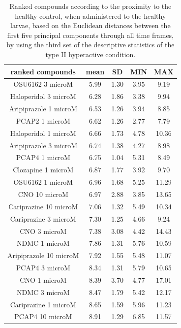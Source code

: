 \documentclass[a4paper,12pt]{article}
\begin{document}
\begin{table}[h!]\tiny
\centering
\caption{Ranked compounds according to the proximity to the healthy control, when administered to the healthy larvae, based on the Euclidean distances between the first five principal components through all time frames, by using the third set of the descriptive statistics of the type II hyperactive condition.}
\begin{tabular}{|c|c|c|c|c|}
\hline
ranked compounds             & mean & SD   & MIN  & MAX   \\ \hline
OSU6162 3 microM       & 5.99  & 1.30  & 3.95 & 9.19  \\ \hline
Haloperidol 3 microM   & 6.28  & 1.86 & 3.38 & 9.94  \\ \hline
Aripiprazole 1 microM  & 6.53  & 1.26 & 3.94 & 8.85  \\ \hline
PCAP2 1 microM         & 6.62  & 1.26 & 2.77 & 7.79  \\ \hline
Haloperidol 1 microM   & 6.66  & 1.73 & 4.78 & 10.36 \\ \hline
Aripiprazole 3 microM  & 6.74  & 1.38 & 4.27 & 8.98  \\ \hline
PCAP4 1 microM       & 6.75  & 1.04 & 5.31 & 8.49  \\ \hline
Clozapine 1 microM     & 6.87  & 1.77 & 3.92 & 9.70   \\ \hline
OSU6162 1 microM       & 6.96  & 1.68 & 5.25 & 11.29 \\ \hline
CNO 10 microM          & 6.97  & 2.88 & 3.85 & 13.65 \\ \hline
Cariprazine 10 microM  & 7.06  & 1.32 & 5.49 & 10.34 \\ \hline
Cariprazine 3 microM   & 7.30   & 1.25 & 4.66 & 9.24  \\ \hline
CNO 3 microM           & 7.38  & 3.08 & 4.42 & 14.43 \\ \hline
NDMC 1 microM          & 7.86  & 1.31 & 5.76 & 10.59 \\ \hline
Aripiprazole 10 microM & 7.92  & 1.55 & 5.48 & 11.07 \\ \hline
PCAP4 3 microM       & 8.34  & 1.31 & 5.79 & 10.65 \\ \hline
CNO 1 microM           & 8.39  & 3.70  & 4.77 & 17.01 \\ \hline
NDMC 3 microM          & 8.47  & 1.79 & 5.42 & 12.17 \\ \hline
Cariprazine 1 microM   & 8.65  & 1.59 & 5.96 & 11.23 \\ \hline
PCAP4 10 microM      & 8.91  & 1.29 & 6.85 & 11.57 \\ \hline

\end{tabular}
\end{table}
\end{document}
